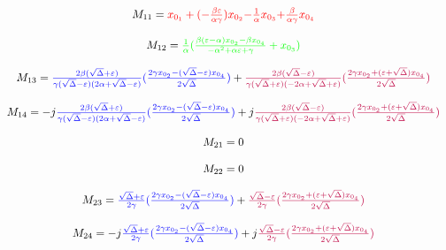 \begin{small}
\begin{displaymath}
\begin{array}{c}
M_{11}={\color{red}x_{0_{1}}+(-\frac{\beta\varepsilon}{\alpha\gamma})x_{0_{2}}}{\color{red}-\frac{1}{\alpha}x_{0_{3}}}{\color{red}+\frac{\beta}{\alpha\gamma}x_{0_{4}}}\\ \\
M_{12}={\color{green}\frac{1}{\alpha}(\frac{\beta(\varepsilon-\alpha)x_{0_{2}}-\beta x_{0_{4}}}{-\alpha^{2}+\alpha\varepsilon+\gamma}+x_{0_{3}})} \\ \\
M_{13}={\color{blue}\frac{2\beta(\sqrt{\Delta}+\varepsilon)}{\gamma(\sqrt{\Delta}-\varepsilon)(2\alpha+\sqrt{\Delta}-\varepsilon)}(\frac{2\gamma x_{0_{2}}-(\sqrt{\Delta}-\varepsilon)x_{0_{4}}}{2\sqrt{\Delta}})}+{\color{purple}\frac{2\beta(\sqrt{\Delta}-\varepsilon)}{\gamma(\sqrt{\Delta}+\varepsilon)(-2\alpha+\sqrt{\Delta}+\varepsilon)}(\frac{2\gamma x_{0_{2}}+(\varepsilon+\sqrt{\Delta})x_{0_{4}}}{2\sqrt{\Delta}})} \\ \\
M_{14}=-j{\color{blue}\frac{2\beta(\sqrt{\Delta}+\varepsilon)}{\gamma(\sqrt{\Delta}-\varepsilon)(2\alpha+\sqrt{\Delta}-\varepsilon)}(\frac{2\gamma x_{0_{2}}-(\sqrt{\Delta}-\varepsilon)x_{0_{4}}}{2\sqrt{\Delta}})}
+j{\color{purple}\frac{2\beta(\sqrt{\Delta}-\varepsilon)}{\gamma(\sqrt{\Delta}+\varepsilon)(-2\alpha+\sqrt{\Delta}+\varepsilon)}(\frac{2\gamma x_{0_{2}}+(\varepsilon+\sqrt{\Delta})x_{0_{4}}}{2\sqrt{\Delta}})} \\ \\
M_{21}=0 \\ \\
M_{22}=0 \\ \\
M_{23}=\textcolor{blue}{\frac{\sqrt{\Delta}+\varepsilon}{2\gamma}(\frac{2\gamma x_{0_{2}}-(\sqrt{\Delta}-\varepsilon)x_{0_{4}}}{2\sqrt{\Delta}})}+\textcolor{purple}{\frac{\sqrt{\Delta}-\varepsilon}{2\gamma}}{\color{purple}(\frac{2\gamma x_{0_{2}}+(\varepsilon+\sqrt{\Delta})x_{0_{4}}}{2\sqrt{\Delta}})} \\ \\
M_{24}=-j\textcolor{blue}{\frac{\sqrt{\Delta}+\varepsilon}{2\gamma}(\frac{2\gamma x_{0_{2}}-(\sqrt{\Delta}-\varepsilon)x_{0_{4}}}{2\sqrt{\Delta}})}+j\textcolor{purple}{\frac{\sqrt{\Delta}-\varepsilon}{2\gamma}}{\color{purple}(\frac{2\gamma x_{0_{2}}+(\varepsilon+\sqrt{\Delta})x_{0_{4}}}{2\sqrt{\Delta}})} \\ \\

\end{array}
\end{displaymath}
\end{small}
